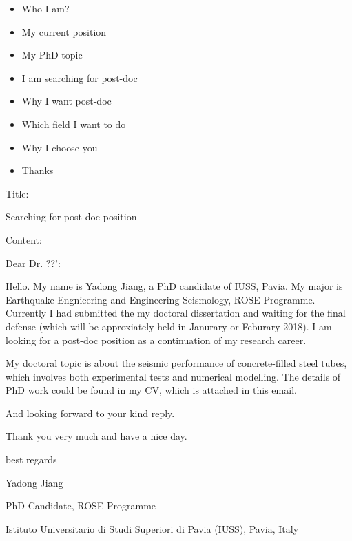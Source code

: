 \documentclass[a4paper]{article}
\begin{document}
\begin{itemize}
	\item Who I am?
	\item My current position
	\item My PhD topic
	\item I am searching for post-doc
	\item Why I want post-doc
	\item Which field I want to do
	\item Why I choose you
	\item Thanks
\end{itemize}




Title:

Searching for post-doc position

Content:

Dear Dr. ??':

Hello. My name is Yadong Jiang, a PhD candidate of IUSS, Pavia. My major is Earthquake Engnieering and Engineering Seismology, ROSE Programme. Currently I had submitted the my doctoral dissertation and waiting for the final defense (which will be approxiately held in Janurary or Feburary 2018).  I am looking for a post-doc position as a continuation of my research career.

My doctoral topic is about the seismic performance of concrete-filled steel tubes, which involves both experimental tests and numerical modelling. The details of PhD work could be found in my CV, which is attached in this email.

And looking forward to your kind reply.

Thank you very much and have a nice day.

best regards

Yadong Jiang

PhD Candidate, ROSE Programme

Istituto Universitario di Studi Superiori di Pavia (IUSS), Pavia, Italy
\end{document}

